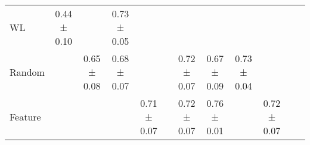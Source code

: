 \begin{table}[ht]
{\begin{tabular}{lccccccccccc}
WL & 0.44 ± 0.10 & \cellcolor{green!25}{0.74 ± 0.04} & 0.73 ± 0.05 & \cellcolor{green!25}{0.75 ± 0.03} & \cellcolor{green!80}{0.76 ± 0.01} & \cellcolor{green!25}{0.76 ± 0.01} & \cellcolor{green!80}{0.78 ± 0.01} & \cellcolor{green!25}{0.76 ± 0.01} & \cellcolor{green!80}{0.78 ± 0.01} & \cellcolor{green!80}{0.78 ± 0.00} \\
Random & \cellcolor{green!25}{0.74 ± 0.02} & 0.65 ± 0.08 & 0.68 ± 0.07 & \cellcolor{green!80}{0.76 ± 0.01} & \cellcolor{green!80}{0.76 ± 0.01} & 0.72 ± 0.07 & 0.67 ± 0.09 & 0.73 ± 0.04 & \cellcolor{green!25}{0.76 ± 0.00} & \cellcolor{green!25}{0.77 ± 0.01} \\
Feature & \cellcolor{green!80}{0.78 ± 0.01} & \cellcolor{green!80}{0.77 ± 0.01} & \cellcolor{green!80}{0.77 ± 0.01} & 0.71 ± 0.07 & \cellcolor{green!80}{0.76 ± 0.02} & 0.72 ± 0.07 & 0.76 ± 0.01 & \cellcolor{green!80}{0.77 ± 0.01} & 0.72 ± 0.07 & \cellcolor{green!80}{0.78 ± 0.00} \\
\bottomrule
\end{tabular}
\label{tab:performance_comparison_large}
}
\end{table}




